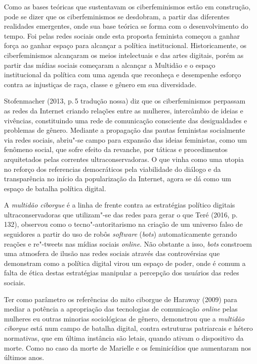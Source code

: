 Como as bases teóricas que sustentavam os ciberfeminismos estão em
construção, pode se dizer que os ciberfeminismos se desdobram, a partir
das diferentes realidades emergentes, onde sua base teórica se forma com
o desenvolvimento do tempo. Foi pelas redes sociais onde esta proposta
feminista começou a ganhar força ao ganhar espaço para alcançar a
política institucional. Historicamente, os ciberfeminismos alcançaram os
meios intelectuais e das artes digitais, porém as partir das mídias
sociais começaram a alcançar a Multidão e o espaço institucional da
política com uma agenda que reconheça e desempenhe esforço contra as
injustiças de raça, classe e gênero em sua diversidade.

Stofenmacher (2013, p.\,5 tradução nossa) diz que os ciberfeminismos
perpassam as redes da Internet criando relações entre as mulheres,
intercâmbio de ideias e vivências, constituindo uma rede de comunicação
consciente das desigualdades e problemas de gênero. Mediante a
propagação das pautas feministas socialmente via redes sociais, abriu"-se
campo para expansão das ideias feministas, como um fenômeno social, que
sofre efeito da revanche, por táticas e procedimentos arquitetados pelas
correntes ultraconservadoras. O que vinha como uma utopia no reforço dos
referencias democráticos pela viabilidade do diálogo e da transparência
no início da popularização da Internet, agora se dá como um espaço de
batalha política digital.

A \textit{multidão ciborgue} é a linha de frente contra as estratégias político
digitais ultraconservadoras que utilizam"-se das redes para gerar o que
Teré (2016, p.\,132), observou como o tecno"-autoritarismo
na criação de um universo falso de seguidores a partir do uso de robôs
\textit{software} (\textit{bots}) automaticamente gerando reações e re"-tweets nas mídias
sociais \textit{online}. Não obstante a isso, \textit{bots} constroem uma atmosfera de
ilusão nas redes sociais através das controvérsias que demonstram como a
política digital virou um espaço de poder, onde é comum a falta de ética
destas estratégias manipular a percepção dos usuários das redes sociais.

Ter como parâmetro os referências do mito ciborgue de Haraway (2009)
para mediar a potência a apropriação das tecnologias de comunicação
\textit{online} pelas mulheres eu outras minorias sociológicas de gênero,
demonstrou que a \textit{multidão ciborgue} está num campo de batalha digital,
contra estruturas patriarcais e hétero normativas, que em última
instância são letais, quando ativam o dispositivo da morte. Como no caso
da morte de Marielle e os feminicídios que aumentaram nos últimos anos.


